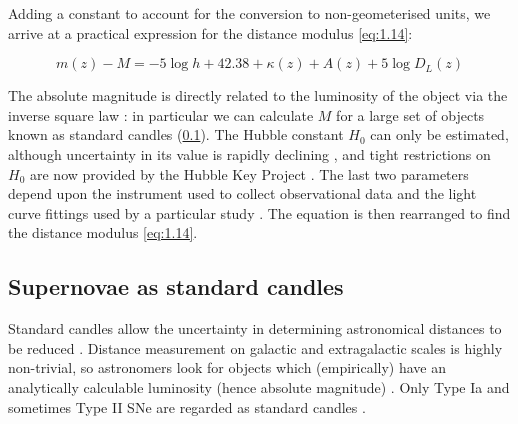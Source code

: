 Adding a constant to account for the conversion to non-geometerised units, we arrive at a practical expression for the distance modulus \cref{eq:1.14}: \cite{Linder1988a}

\begin{equation}
m(z) - M = -5 \log{} h + 42.38 + \kappa{}(z) + A(z) + 5 \log{} D_{L}(z)
\label{eq:1.14}
\end{equation}

The absolute magnitude is directly related to the luminosity of the object via the inverse square law \cite{Harrison1993,Hogg2000}: in particular we can calculate $M$ for a large set of objects known as standard candles (\cref{subsec:supernovae-standard-candles}). The Hubble constant $H_0$ can only be estimated, although uncertainty in its value is rapidly declining \cite{Harrison1993}, and tight restrictions on $H_0$ are now provided by the Hubble Key Project \cite{LewisBridle2002}. The last two parameters depend upon the instrument used to collect observational data and the light curve fittings used by a particular study \cite{Hicken2009}. The equation is then rearranged to find the distance modulus \cref{eq:1.14}.

\subsection{Supernovae as standard candles}
\label{subsec:supernovae-standard-candles}

Standard candles allow the uncertainty in determining astronomical distances to be reduced \cite{Harrison1993}. Distance measurement on galactic and extragalactic scales is highly non-trivial, so astronomers look for objects which (empirically) have an analytically calculable luminosity (hence absolute magnitude) \cite{Silk1989}. Only Type Ia and sometimes Type II SNe are regarded as standard candles \cite{Leibundgut2008}. 

